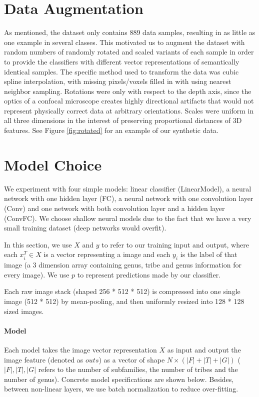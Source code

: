 \documentclass{article}
\begin{document}
\section{Data Augmentation}

As mentioned, the dataset only contains 889 data samples, resulting in as little as one example in several classes. This motivated us to augment the dataset with random numbers of randomly rotated and scaled variants of each sample in order to provide the classifiers with different vector representations of semantically identical samples. The specific method used to transform the data was cubic spline interpolation, with missing pixels/voxels filled in with using nearest neighbor sampling. Rotations were only with respect to the depth axis, since the optics of a confocal microscope creates highly directional artifacts that would not represent physically correct data at arbitrary orientations. Scales were uniform in all three dimensions in the interest of preserving proportional distances of 3D features. See Figure \ref{fig:rotated} for an example of our synthetic data.


\section{Model Choice}

We experiment with four simple models: linear classifier (LinearModel), a neural network with one hidden layer (FC), a neural network with one convolution layer (Conv) and one network with both convolution layer and a hidden layer (ConvFC). We choose shallow neural models due to the fact that we have a very small training dataset (deep networks would overfit).

In this section, we use ${X}$ and ${y}$ to refer to our training input and output, where each ${x}_i^T\in {X}$ is a vector representing a image and each ${y_i}$ is the label of that image (a 3 dimension array containing genus, tribe and genus information for every image). We use ${p}$ to represent predictions made by our classifier. 

Each raw image stack (shaped 256 * 512 * 512) is compressed into one single image (512 * 512) by mean-pooling, and then uniformly resized into 128 * 128 sized images.

\paragraph{Model}

Each model takes the image vector representation $X$ as input and output the image feature (denoted as $\mathit{outs}$) as a vector of shape $N\times (|F| + |T| + |G|)$ ($|F|, |T|, |G|$ refers to the number of subfamilies, the number of tribes and the number of genus). Concrete model specifications are shown below. Besides, between non-linear layers, we use batch normalization to reduce over-fitting.
\end{document}
